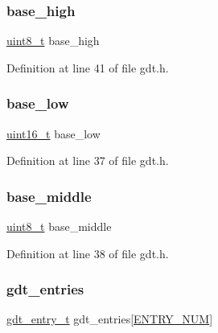 \subsubsection{\texorpdfstring{base\+\_\+high}{base\_high}}
{\footnotesize\ttfamily \hyperlink{a00104_aba7bc1797add20fe3efdf37ced1182c5_aba7bc1797add20fe3efdf37ced1182c5}{uint8\+\_\+t} base\+\_\+high}



Definition at line 41 of file gdt.\+h.

\mbox{\label{a00071_a71e21ea67de59991e9a27666a1752a8f_a71e21ea67de59991e9a27666a1752a8f}} 
\subsubsection{\texorpdfstring{base\+\_\+low}{base\_low}}
{\footnotesize\ttfamily \hyperlink{a00104_a273cf69d639a59973b6019625df33e30_a273cf69d639a59973b6019625df33e30}{uint16\+\_\+t} base\+\_\+low}



Definition at line 37 of file gdt.\+h.

\mbox{\label{a00071_a6b67e86f6de9204d76adab79069aec29_a6b67e86f6de9204d76adab79069aec29}} 
\subsubsection{\texorpdfstring{base\+\_\+middle}{base\_middle}}
{\footnotesize\ttfamily \hyperlink{a00104_aba7bc1797add20fe3efdf37ced1182c5_aba7bc1797add20fe3efdf37ced1182c5}{uint8\+\_\+t} base\+\_\+middle}



Definition at line 38 of file gdt.\+h.

\mbox{\label{a00071_a29ae43d712f89a273f1e9e461b690218_a29ae43d712f89a273f1e9e461b690218}} 
\subsubsection{\texorpdfstring{gdt\+\_\+entries}{gdt\_entries}}
{\footnotesize\ttfamily \hyperlink{a00071_ab0b5c60e06a63669c783705278ff641e_ab0b5c60e06a63669c783705278ff641e}{gdt\+\_\+entry\+\_\+t} gdt\+\_\+entries\mbox{[}\hyperlink{a00071_abe29d44fbb5292a15af80cbb8e8a3a7d_abe29d44fbb5292a15af80cbb8e8a3a7d}{E\+N\+T\+R\+Y\+\_\+\+N\+UM}\mbox{]}}



